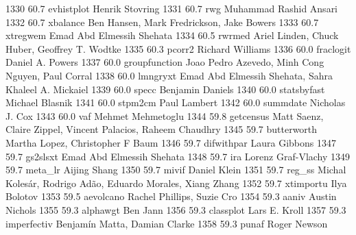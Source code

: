   1330     60.7    evhistplot    Henrik Stovring                         
  1331     60.7    rwg           Muhammad Rashid Ansari                  
  1332     60.7    xbalance      Ben Hansen, Mark Fredrickson, Jake      
                                   Bowers                                  
  1333     60.7    xtregwem      Emad Abd Elmessih Shehata               
  1334     60.5    rwrmed        Ariel Linden, Chuck Huber, Geoffrey T.  
                                   Wodtke                                  
  1335     60.3    pcorr2        Richard Williams                        
  1336     60.0    fraclogit     Daniel A. Powers                        
  1337     60.0    groupfunction  Joao Pedro Azevedo, Minh Cong Nguyen,   
                                   Paul Corral                             
  1338     60.0    lmngryxt      Emad Abd Elmessih Shehata, Sahra        
                                   Khaleel A. Mickaiel                     
  1339     60.0    specc         Benjamin Daniels                        
  1340     60.0    statsbyfast   Michael Blasnik                         
  1341     60.0    stpm2cm       Paul Lambert                            
  1342     60.0    summdate      Nicholas J. Cox                         
  1343     60.0    vaf           Mehmet Mehmetoglu                       
  1344     59.8    getcensus     Matt Saenz, Claire Zippel, Vincent      
                                   Palacios, Raheem Chaudhry               
  1345     59.7    butterworth   Martha Lopez, Christopher F Baum        
  1346     59.7    difwithpar    Laura Gibbons                           
  1347     59.7    gs2slsxt      Emad Abd Elmessih Shehata               
  1348     59.7    ira           Lorenz Graf-Vlachy                      
  1349     59.7    meta_lr       Aijing Shang                            
  1350     59.7    mivif         Daniel Klein                            
  1351     59.7    reg_ss        Michal Kolesár, Rodrigo Adão, Eduardo 
                                   Morales, Xiang Zhang                    
  1352     59.7    xtimportu     Ilya Bolotov                            
  1353     59.5    aevolcano     Rachel Phillips, Suzie Cro              
  1354     59.3    aaniv         Austin Nichols                          
  1355     59.3    alphawgt      Ben Jann                                
  1356     59.3    classplot     Lars E. Kroll                           
  1357     59.3    imperfectiv   Benjamín Matta, Damian Clarke          
  1358     59.3    punaf         Roger Newson                            
